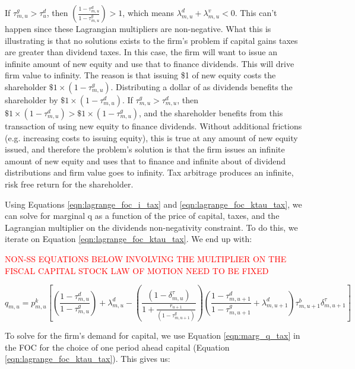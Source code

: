\documentclass[letterpaper,12pt]{article}
\theoremstyle{definition}
\begin{document}
\begin{spacing}{1.5}
If $\tau^{g}_{m,u}> \tau^{d}_{u}$, then $ \left(\frac{1-\tau^{d}_{m,u}}{1-\tau^{g}_{m,u}}\right)>1$, which means  $ \lambda^{d}_{m,u} + \lambda^{v}_{m,u} <0$.  This can't happen since these Lagrangian multipliers are non-negative.  What this is illustrating is that no solutions exists to the firm's problem if capital gains taxes are greater than dividend taxes.  In this case, the firm will want to issue an infinite amount of new equity and use that to finance dividends.  This will drive firm value to infinity.  The reason is that issuing \$1 of new equity costs the shareholder $\$1\times(1-\tau^{g}_{m,u})$.  Distributing a dollar of as dividends benefits the shareholder by $\$1\times (1-\tau^{d}_{m,u})$.  If $\tau^{g}_{m,u}> \tau^{d}_{m,u}$, then $\$1\times (1-\tau^{d}_{m,u}) > \$1\times(1-\tau^{g}_{m,u})$, and the shareholder benefits from this transaction of using new equity to finance dividends.  Without additional frictions (e.g. increasing costs to issuing equity), this is true at any amount of new equity issued, and therefore the problem's solution is that the firm issues an infinite amount of new equity and uses that to finance and infinite about of dividend distributions and firm value goes to infinity.  Tax arbitrage produces an infinite, risk free return for the shareholder.

Using Equations \ref{eqn:lagrange_foc_i_tax} and \ref{eqn:lagrange_foc_ktau_tax}, we can solve for marginal q as a function of the price of capital, taxes, and the Lagrangian multiplier on the dividends non-negativity constraint.  To do this, we iterate on Equation \ref{eqn:lagrange_foc_ktau_tax}.  We end up with:

\textcolor{red}{NON-SS EQUATIONS BELOW INVOLVING THE MULTIPLIER ON THE FISCAL CAPITAL STOCK LAW OF MOTION NEED TO BE FIXED}

\begin{equation}
\label{eqn:marg_q_tax}
q_{m,u} = p^{k}_{m,u}\left[\left(\frac{1-\tau^{d}_{m,u}}{1-\tau^{g}_{m,u}}\right) + \lambda^{d}_{m,u} -  \left(\frac{(1-\delta^{\tau}_{m,u})}{1+\frac{r_{u+1}}{(1-\tau^{g}_{m,u+1})}}\right)  \left(\frac{1-\tau^{d}_{m,u+1}}{1-\tau^{g}_{m,u+1}}+\lambda^{d}_{m,u+1}\right)\tau^{b}_{m,u+1}\delta^{\tau}_{m,u+1} \right] 
\end{equation}

To solve for the firm's demand for capital, we use Equation \ref{eqn:marg_q_tax} in the FOC for the choice of one period ahead capital (Equation \ref{eqn:lagrange_foc_ktau_tax}).  This gives us:


\end{spacing}
\end{document}
